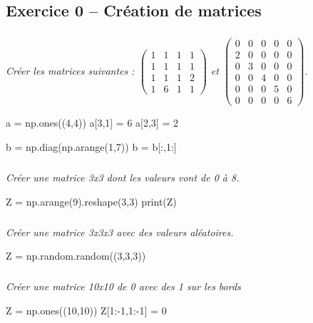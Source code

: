\documentclass[10pt,fleqn]{article} %
\begin{document}

\vspace{5cm}
\pagestyle{fancy}
\thispagestyle{plain}


\def\columnseprulecolor{\color{ocre}}
\setlength{\columnseprule}{0.4pt} 
\ifprof
\else
\begin{multicols}{2}
\fi
\section*{Exercice 0 -- Création de matrices}
\subparagraph{}\textit{Créer les matrices suivantes : $\begin{pmatrix} 1 & 1 & 1 & 1 \\ 1 & 1 & 1 & 1 \\ 1 & 1 & 1 & 2 \\ 1 & 6 & 1 & 1 \end{pmatrix}$ et $\begin{pmatrix} 0 & 0 & 0 & 0 & 0 \\ 2 &0& 0& 0& 0 \\ 0& 3& 0& 0& 0\\ 0& 0& 4 &0& 0 \\
 0 &0 &0 &5 &0 \\ 0& 0& 0& 0 &6\end{pmatrix}$.}

\ifprof
\begin{corrige}
\begin{python}
a = np.ones((4,4))
a[3,1] = 6
a[2,3] = 2

b = np.diag(np.arange(1,7))
b = b[:,1:] 
\end{python}
\end{corrige}
\else
\fi

\subparagraph{}\textit{Créer une matrice 3x3 dont les valeurs vont de 0 à 8.}
\ifprof
\begin{corrige}
\begin{python}
Z = np.arange(9).reshape(3,3)
print(Z)
\end{python}
\end{corrige}
\else
\fi


\subparagraph{}\textit{Créer une matrice 3x3x3 avec des valeurs aléatoires.}
\ifprof
\begin{corrige}
\begin{python}
Z = np.random.random((3,3,3))

\end{python}
\end{corrige}
\else
\fi

\subparagraph{}\textit{Créer une matrice 10x10 de 0 avec des 1 sur les bords}
\ifprof
\begin{corrige}
\begin{python}
Z = np.ones((10,10))
Z[1:-1,1:-1] = 0
\end{python}
\end{corrige}
\else
\fi



\end{multicols}
\end{document}
